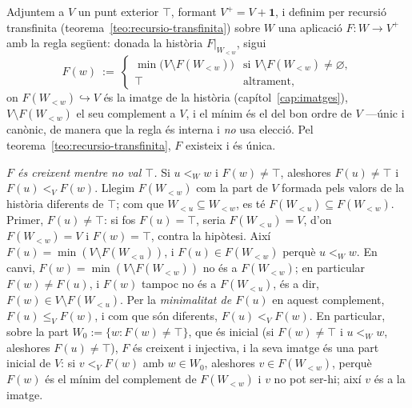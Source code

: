 \begin{prova}
Adjuntem a \(V\) un punt exterior \(\top\), formant \(V^{+}=V+\mathbf1\), i
definim per recursió transfinita (teorema~\ref{teo:recursio-transfinita})
sobre \(W\) una aplicació \(F\colon W\to V^{+}\) amb la regla següent: donada
la història \(F|_{W_{<w}}\), sigui
\[
F(w)\ :=\
\begin{cases}
\min\bigl(V\setminus F(W_{<w})\bigr) & \text{si } V\setminus F(W_{<w})\neq\varnothing,\\[1mm]
\top & \text{altrament,}
\end{cases}
\]
on \(F(W_{<w})\hookrightarrow V\) és la imatge de la història
(capítol~\ref{cap:imatges}), \(V\setminus F(W_{<w})\) el seu complement a
\(V\), i el mínim és el del bon ordre de \(V\) ---únic i canònic, de manera
que la regla és interna i \emph{no} usa elecció. Pel
teorema~\ref{teo:recursio-transfinita}, \(F\) existeix i és única.

\emph{\(F\) és creixent mentre no val \(\top\).} Si \(u<_W w\) i \(F(w)\neq
\top\), aleshores \(F(u)\neq\top\) i \(F(u)<_V F(w)\). Llegim \(F(W_{<w})\)
com la part de \(V\) formada pels valors de la història diferents de
\(\top\); com que \(W_{<u}\subseteq W_{<w}\), es té
\(F(W_{<u})\subseteq F(W_{<w})\). Primer, \(F(u)\neq\top\): si fos
\(F(u)=\top\), seria \(F(W_{<u})=V\), d'on \(F(W_{<w})=V\) i \(F(w)=\top\),
contra la hipòtesi. Així \(F(u)=\min(V\setminus F(W_{<u}))\), i \(F(u)\in
F(W_{<w})\) perquè \(u<_W w\). En canvi, \(F(w)=\min(V\setminus F(W_{<w}))\)
no és a \(F(W_{<w})\); en particular \(F(w)\neq F(u)\), i \(F(w)\) tampoc no
és a \(F(W_{<u})\), és a dir, \(F(w)\in V\setminus F(W_{<u})\). Per la
\emph{minimalitat de \(F(u)\)} en aquest complement, \(F(u)\le_V F(w)\), i com
que són diferents, \(F(u)<_V F(w)\).
En particular, sobre la part \(W_0:=\{w: F(w)\neq\top\}\), que és inicial
(si \(F(w)\neq\top\) i \(u<_W w\), aleshores \(F(u)\neq\top\)), \(F\) és
creixent i injectiva, i la seva imatge és una part inicial de \(V\): si \(v<_VF(w)\) amb
\(w\in W_0\), aleshores \(v\in F(W_{<w})\), perquè \(F(w)\) és el mínim del
complement de \(F(W_{<w})\) i \(v\) no pot ser-hi; així \(v\) és a la
imatge.


\end{prova}
